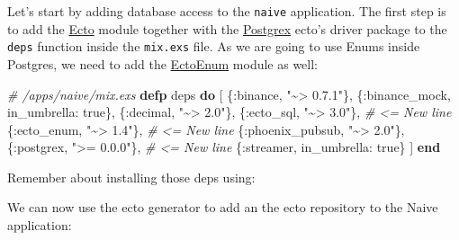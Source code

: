 \documentclass[
  oneside]{book}
\newenvironment{Shaded}{\begin{snugshade}}{\end{snugshade}}
\newcommand{\CommentTok}[1]{\textcolor[rgb]{0.56,0.35,0.01}{\textit{#1}}}
\newcommand{\ConstantTok}[1]{\textcolor[rgb]{0.00,0.00,0.00}{#1}}
\newcommand{\ExtensionTok}[1]{#1}
\newcommand{\KeywordTok}[1]{\textcolor[rgb]{0.13,0.29,0.53}{\textbf{#1}}}
\newcommand{\NormalTok}[1]{#1}
\newcommand{\StringTok}[1]{\textcolor[rgb]{0.31,0.60,0.02}{#1}}
\newcommand{\VariableTok}[1]{\textcolor[rgb]{0.00,0.00,0.00}{#1}}
\begin{document}
Let's start by adding database access to the \texttt{naive} application. The first step is to add the \href{https://github.com/elixir-ecto/ecto}{Ecto} module together with the \href{https://github.com/elixir-ecto/postgrex}{Postgrex} ecto's driver package to the \texttt{deps} function inside the \texttt{mix.exs} file. As we are going to use Enums inside Postgres, we need to add the \href{https://github.com/gjaldon/ecto_enum}{EctoEnum} module as well:

\begin{Shaded}
\begin{Highlighting}[]
  \CommentTok{\# /apps/naive/mix.exs}
  \KeywordTok{defp}\NormalTok{ deps }\KeywordTok{do}
\NormalTok{    [}
\NormalTok{      \{}\VariableTok{:binance}\NormalTok{, }\StringTok{"\textasciitilde{}\textgreater{} 0.7.1"}\NormalTok{\},}
\NormalTok{      \{}\VariableTok{:binance\_mock}\NormalTok{, }\VariableTok{in\_umbrella:} \ConstantTok{true}\NormalTok{\},}
\NormalTok{      \{}\VariableTok{:decimal}\NormalTok{, }\StringTok{"\textasciitilde{}\textgreater{} 2.0"}\NormalTok{\},}
\NormalTok{      \{}\VariableTok{:ecto\_sql}\NormalTok{, }\StringTok{"\textasciitilde{}\textgreater{} 3.0"}\NormalTok{\},     }\CommentTok{\# \textless{}= New line}
\NormalTok{      \{}\VariableTok{:ecto\_enum}\NormalTok{, }\StringTok{"\textasciitilde{}\textgreater{} 1.4"}\NormalTok{\},    }\CommentTok{\# \textless{}= New line}
\NormalTok{      \{}\VariableTok{:phoenix\_pubsub}\NormalTok{, }\StringTok{"\textasciitilde{}\textgreater{} 2.0"}\NormalTok{\},}
\NormalTok{      \{}\VariableTok{:postgrex}\NormalTok{, }\StringTok{"\textgreater{}= 0.0.0"}\NormalTok{\},   }\CommentTok{\# \textless{}= New line}
\NormalTok{      \{}\VariableTok{:streamer}\NormalTok{, }\VariableTok{in\_umbrella:} \ConstantTok{true}\NormalTok{\}}
\NormalTok{    ]}
  \KeywordTok{end}
\end{Highlighting}
\end{Shaded}

Remember about installing those deps using:

\begin{Shaded}
\end{Shaded}

We can now use the ecto generator to add an the ecto repository to the Naive application:
\end{document}
